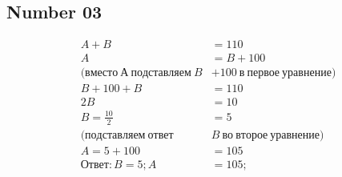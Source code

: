 \documentclass[a4paper,12pt]{article}
\begin{document}
\subsection{Number 03}
\begin{align*}
A + B &= 110 \\
A &= B + 100 \\
(вместо~А~подставляем~B &+ 100~в~первое~уравнение) \\
B + 100 + B &= 110 \\
2B &= 10 \\
B = \frac{10}{2} &= 5 \\
(подставляем~ответ~&B~во~второе~уравнение) \\
A = 5 + 100 &= 105 \\
Ответ:
B = 5; A &= 105;
\end{align*}
\end{document}
